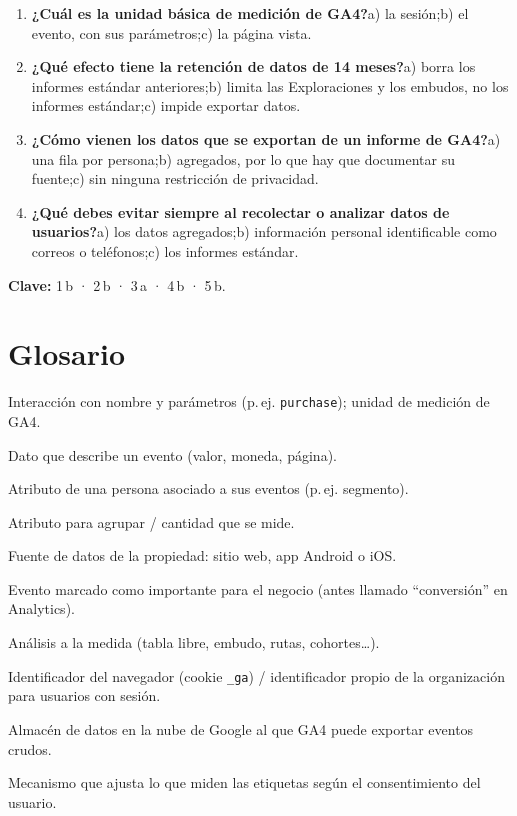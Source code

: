\documentclass[11pt,letterpaper]{article}
\begin{document}
\begin{enumerate}
  \item \textbf{¿Cuál es la unidad básica de medición de GA4?}\quad a) la sesión;\quad b) el evento, con sus parámetros;\quad c) la página vista.
  \item \textbf{¿Qué efecto tiene la retención de datos de 14 meses?}\quad a) borra los informes estándar anteriores;\quad b) limita las Exploraciones y los embudos, no los informes estándar;\quad c) impide exportar datos.
  \item \textbf{¿Cómo vienen los datos que se exportan de un informe de GA4?}\quad a) una fila por persona;\quad b) agregados, por lo que hay que documentar su fuente;\quad c) sin ninguna restricción de privacidad.
  \item \textbf{¿Qué debes evitar siempre al recolectar o analizar datos de usuarios?}\quad a) los datos agregados;\quad b) información personal identificable como correos o teléfonos;\quad c) los informes estándar.
\end{enumerate}
\textbf{Clave:} 1\,b · 2\,b · 3\,a · 4\,b · 5\,b.

\section{Glosario}

\begin{description}[leftmargin=1.2cm,style=nextline]
  \item[Evento] Interacción con nombre y parámetros (p.\,ej. \texttt{purchase}); unidad de medición de GA4.
  \item[Parámetro] Dato que describe un evento (valor, moneda, página).
  \item[Propiedad de usuario] Atributo de una persona asociado a sus eventos (p.\,ej. segmento).
  \item[Dimensión / métrica] Atributo para agrupar / cantidad que se mide.
  \item[Flujo de datos (\emph{data stream})] Fuente de datos de la propiedad: sitio web, app Android o iOS.
  \item[Evento clave (\emph{key event})] Evento marcado como importante para el negocio (antes llamado \enquote{conversión} en Analytics).
  \item[Exploración] Análisis a la medida (tabla libre, embudo, rutas, cohortes\ldots).
  \item[Client ID / User-ID] Identificador del navegador (cookie \texttt{\_ga}) / identificador propio de la organización para usuarios con sesión.
  \item[BigQuery] Almacén de datos en la nube de Google al que GA4 puede exportar eventos crudos.
  \item[Consent Mode] Mecanismo que ajusta lo que miden las etiquetas según el consentimiento del usuario.
\end{description}
\end{document}
